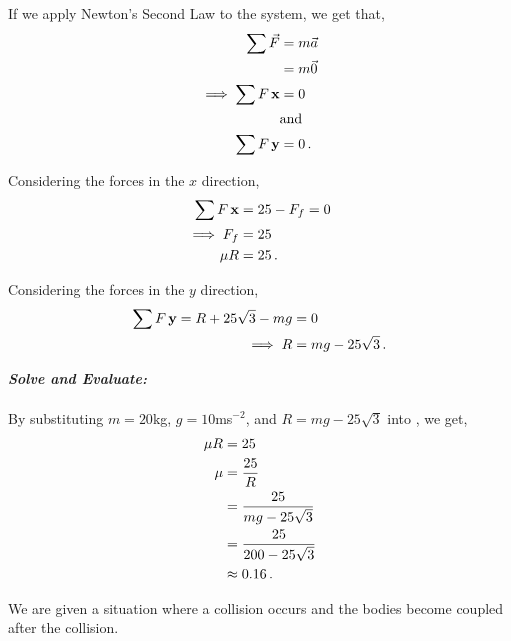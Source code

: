 \begin{subquestions}
If we apply Newton's Second Law to the system, we get that,
\begin{align}
	\sum \vec{F} & = m\vec{a} \nonumber \\
	& = m\vec{0} \nonumber \\
	\implies \sum F\,\mathbf{x} & = 0  \\
	& \text {and} \nonumber \\
	\sum F\,\mathbf{y} & = 0 \,.
\end{align}
	
Considering the forces in the $x$ direction,
\begin{align}
	\sum F\,\mathbf{x} & = 25 - F_f =0 \nonumber \\
	\implies F_f & = 25 \nonumber \\
	         \mu R & = 25 \,. \label{2016:q6:EqnB}
\end{align}

Considering the forces in the $y$ direction,
\begin{align}
	\sum F\,\mathbf{y} = R + 25\sqrt{3} -mg & = 0 \nonumber \\
	         \implies R & = mg - 25\sqrt{3} \,.
\end{align}




\textbf{\textit{Solve and Evaluate:}} \\ \\
By substituting $m=20$kg, $g=10$ms$^{-2}$, and $R = mg - 25\sqrt{3}$ into , we get,
\begin{align}
	\mu R & = 25 \nonumber \\
	\mu & = \frac{25}{R} \nonumber \\
	& = \frac{25}{mg - 25\sqrt{3}} \nonumber \\
	& = \frac{25}{200 - 25\sqrt{3}} \nonumber \\
	& \approx 0.16 \,.
\end{align}


\subquestion

\begin{subsubquestions}
	
\subsubquestion

We are given a situation where a collision occurs and the bodies become coupled after the collision.


\end{subsubquestions}
\end{subquestions}
